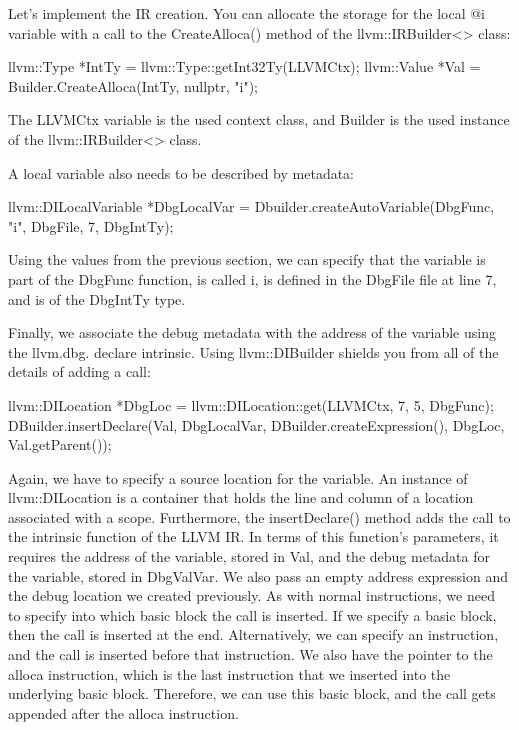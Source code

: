 Let’s implement the IR creation. You can allocate the storage for the local @i variable with a call to the CreateAlloca() method of the llvm::IRBuilder<> class:

\begin{cpp}
llvm::Type *IntTy = llvm::Type::getInt32Ty(LLVMCtx);
llvm::Value *Val = Builder.CreateAlloca(IntTy, nullptr, "i");
\end{cpp}

The LLVMCtx variable is the used context class, and Builder is the used instance of the llvm::IRBuilder<> class.

A local variable also needs to be described by metadata:

\begin{cpp}
llvm::DILocalVariable *DbgLocalVar =
    Dbuilder.createAutoVariable(DbgFunc, "i", DbgFile,
                                7, DbgIntTy);
\end{cpp}

Using the values from the previous section, we can specify that the variable is part of the DbgFunc function, is called i, is defined in the DbgFile file at line 7, and is of the DbgIntTy type.

Finally, we associate the debug metadata with the address of the variable using the llvm.dbg. declare intrinsic. Using llvm::DIBuilder shields you from all of the details of adding a call:

\begin{cpp}
llvm::DILocation *DbgLoc =
                llvm::DILocation::get(LLVMCtx, 7, 5, DbgFunc);
DBuilder.insertDeclare(Val, DbgLocalVar,
                        DBuilder.createExpression(), DbgLoc,
                        Val.getParent());
\end{cpp}

Again, we have to specify a source location for the variable. An instance of llvm::DILocation is a container that holds the line and column of a location associated with a scope. Furthermore, the insertDeclare() method adds the call to the intrinsic function of the LLVM IR. In terms of this function’s parameters, it requires the address of the variable, stored in Val, and the debug metadata for the variable, stored in DbgValVar. We also pass an empty address expression and the debug location we created previously. As with normal instructions, we need to specify into which basic block the call is inserted. If we specify a basic block, then the call is inserted at the end. Alternatively, we can specify an instruction, and the call is inserted before that instruction. We also have the pointer to the alloca instruction, which is the last instruction that we inserted into the underlying basic block. Therefore, we can use this basic block, and the call gets appended after the alloca instruction.

